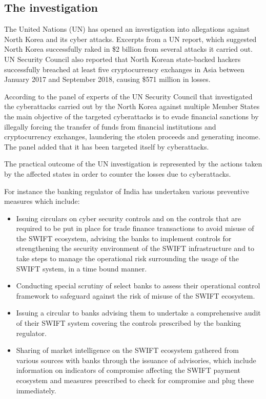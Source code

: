\documentclass[12pt]{article}
\begin{document}
        \subsection{The investigation}
        
        The United Nations (UN) has opened an investigation into allegations against North Korea and its cyber attacks. Excerpts from a UN report, which suggested North Korea successfully raked in \$2 billion from several attacks it carried out. UN Security Council also reported that North Korean state-backed hackers successfully breached at least five cryptocurrency exchanges in Asia between January 2017 and September 2018, causing \$571 million in losses. 
        
        According to the panel of experts of the UN Security Council that investigated  the cyberattacks carried out by the North Korea against multiple Member States the main objective of the targeted cyberattacks is to evade financial sanctions by illegally forcing the transfer of funds from financial institutions and cryptocurrency exchanges, laundering the stolen proceeds and generating income.
        The panel added that it has been targeted itself by cyberattacks. 
        
        The practical outcome of the UN investigation is represented by the actions taken by the affected states in order to counter the losses due to cyberattacks.
        
        For instance the banking regulator of India has undertaken various preventive measures which include:
        \begin{itemize}
            \item Issuing circulars on cyber security controls and on the controls that are required to be put in place for trade finance transactions to avoid misuse of the SWIFT ecosystem, advising the banks to implement controls for strengthening the security environment of the SWIFT infrastructure and to take steps to manage the operational risk surrounding the usage of the SWIFT system, in a time bound manner.
            \item Conducting special scrutiny of select banks to assess their operational control framework to safeguard against the risk of misuse of the SWIFT ecosystem.
            \item Issuing a circular to banks advising them to undertake a comprehensive audit of their SWIFT system covering the controls prescribed by the banking regulator.
            \item Sharing of market intelligence on the SWIFT ecosystem gathered from various sources with banks through the issuance of advisories, which include information on indicators of compromise affecting the SWIFT payment ecosystem and measures prescribed to check for compromise and plug these immediately.
        \end{itemize}
        
\end{document}

